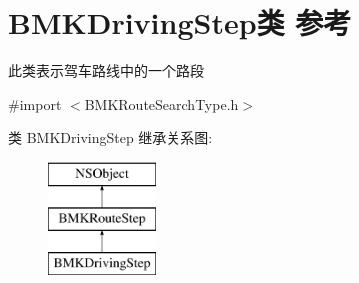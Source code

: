 \hypertarget{interface_b_m_k_driving_step}{\section{B\+M\+K\+Driving\+Step类 参考}
\label{interface_b_m_k_driving_step}
}


此类表示驾车路线中的一个路段  




{\ttfamily \#import $<$B\+M\+K\+Route\+Search\+Type.\+h$>$}

类 B\+M\+K\+Driving\+Step 继承关系图\+:\begin{figure}[H]
\begin{center}
\leavevmode
\includegraphics[height=3.000000cm]{interface_b_m_k_driving_step}
\end{center}
\end{figure}
